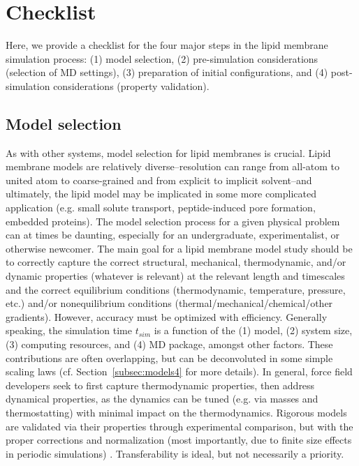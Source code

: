 \documentclass[9pt,bestpractices]{livecoms}
\begin{document}
\section{Checklist}
\label{sec:checklist}
Here, we provide a checklist for the four major steps in the lipid membrane simulation process: (1) model selection, (2) pre-simulation considerations (selection of MD settings), (3) preparation of initial configurations, and (4) post-simulation considerations (property validation).

\subsection{Model selection}
\label{subsec:models3}
As with other systems, model selection for lipid membranes is crucial.
Lipid membrane models are relatively diverse--resolution can range from all-atom to united atom to coarse-grained and from explicit to implicit solvent--and ultimately, the lipid model may be implicated in some more complicated application (e.g. small solute transport, peptide-induced pore formation, embedded proteins).
The model selection process for a given physical problem can at times be daunting, especially for an undergraduate, experimentalist, or otherwise newcomer.
The main goal for a lipid membrane model study should be to correctly capture the correct structural, mechanical, thermodynamic, and/or dynamic properties (whatever is relevant) at the relevant length and timescales and the correct equilibrium conditions (thermodynamic, temperature, pressure, etc.) and/or nonequilibrium conditions (thermal/mechanical/chemical/other gradients).
However, accuracy must be optimized with efficiency.
Generally speaking, the simulation time $t_{sim}$ is a function of the (1) model, (2) system size, (3) computing resources, and (4) MD package, amongst other factors.
These contributions are often overlapping, but can be deconvoluted in some simple scaling laws (cf. Section~\ref{subsec:models4} for more details).
In general, force field developers seek to first capture thermodynamic properties, then address dynamical properties, as the dynamics can be tuned (e.g. via masses and thermostatting) with minimal impact on the thermodynamics.
Rigorous models are validated via their properties through experimental comparison, but with the proper corrections and normalization (most importantly, due to finite size effects in periodic simulations) \cite{Venable2017}.
Transferability is ideal, but not necessarily a priority.
\end{document}
